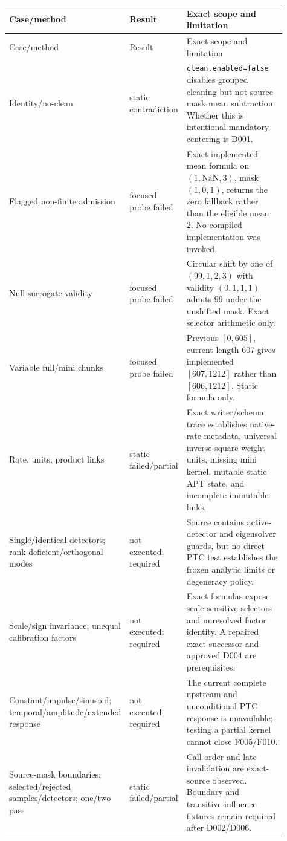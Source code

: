 \documentclass[11pt]{article}
\newcommand{\code}[1]{\nolinkurl{#1}}
\begin{document}
\begin{longtable}{L{0.27\linewidth}L{0.17\linewidth}L{0.47\linewidth}}
\toprule
Case/method & Result & Exact scope and limitation\\
\midrule
\endfirsthead
\toprule
Case/method & Result & Exact scope and limitation\\
\midrule
\endhead
Identity/no-clean &
static contradiction &
\code{clean.enabled=false} disables grouped cleaning but not source-mask mean
subtraction.  Whether this is intentional mandatory centering is D001.\\
Flagged non-finite admission &
focused probe failed &
Exact implemented mean formula on \((1,\mathrm{NaN},3)\), mask
\((1,0,1)\), returns the zero fallback rather than the eligible mean 2.
No compiled implementation was invoked.\\
Null surrogate validity &
focused probe failed &
Circular shift by one of \((99,1,2,3)\) with validity \((0,1,1,1)\)
admits 99 under the unshifted mask.  Exact selector arithmetic only.\\
Variable full/mini chunks &
focused probe failed &
Previous \([0,605]\), current length 607 gives implemented
\([607,1212]\) rather than \([606,1212]\).  Static formula only.\\
Rate, units, product links &
static failed/partial &
Exact writer/schema trace establishes native-rate metadata, universal
inverse-square weight units, missing mini kernel, mutable static APT state,
and incomplete immutable links.\\
Single/identical detectors; rank-deficient/orthogonal modes &
not executed; required &
Source contains active-detector and eigensolver guards, but no direct PTC test
establishes the frozen analytic limits or degeneracy policy.\\
Scale/sign invariance; unequal calibration factors &
not executed; required &
Exact formulas expose scale-sensitive selectors and unresolved factor
identity.  A repaired exact successor and approved D004 are prerequisites.\\
Constant/impulse/sinusoid; temporal/amplitude/extended response &
not executed; required &
The current complete upstream and unconditional PTC response is unavailable;
testing a partial kernel cannot close F005/F010.\\
Source-mask boundaries; selected/rejected samples/detectors; one/two pass &
static failed/partial &
Call order and late invalidation are exact-source observed.  Boundary and
transitive-influence fixtures remain required after D002/D006.\\

\end{longtable}
\end{document}
